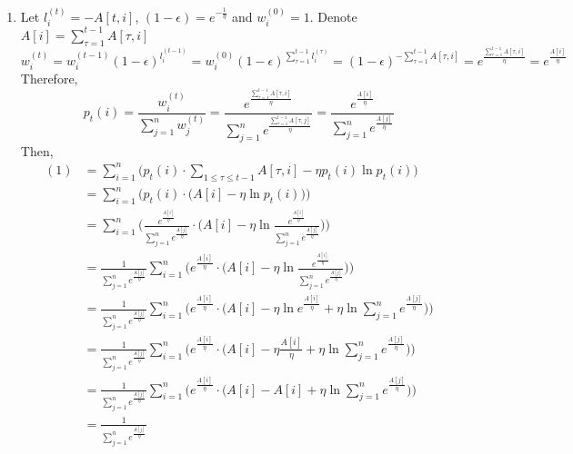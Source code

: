 \documentclass[11pt]{article}
\newenvironment{qparts}{\begin{enumerate}[{(}a{)}]}{\end{enumerate}}
\begin{document}
\begin{qparts}
	\item
	
	Let $l_i^{(t)} = - A[t, i]$, $(1 - \epsilon) = e^{- \frac{1}{\eta}}$ and $w_i^{(0)} = 1$. Denote $A[i] = \sum_{\tau=1}^{t-1} A[\tau, i]$
	\[
		w_i^{(t)} 
		= w_i^{(t-1)}(1 - \epsilon)^{l_i^{(t-1)}} 
		= w_i^{(0)}(1 - \epsilon)^{\sum_{\tau=1}^{t-1} l_i^{(\tau)}}
		= (1 - \epsilon)^{-\sum_{\tau=1}^{t-1}A[\tau, i]}
		= e^{ \frac{\sum_{\tau=1}^{t-1} A[\tau, i]}{\eta}}
		= e^{ \frac{A[i]}{\eta}}
	\]
	Therefore, 
	\[
		p_t(i)
		= \frac{w_i^{(t)}}{\sum_{j=1}^{n} w_j^{(t)} }
		= \frac{e^{ \frac{\sum_{\tau=1}^{t-1} A[\tau, i]}{\eta}}}{\sum_{j=1}^{n} e^{ \frac{\sum_{\tau=1}^{t-1} A[\tau, j]}{\eta}}}
		= \frac{e^{ \frac{A[i]}{\eta}}}{\sum_{j=1}^{n} e^{ \frac{A[j]}{\eta}}}
	\]
	Then, 
	\begin{align*}
		(1)
		&=
		\sum_{i=1}^n 
		\Bigg( 
		p_t(i) 
		\cdot 
		\sum_{1\le \tau \le t-1} A[\tau,i] 
		- 
		\eta p_t(i) \ln p_t(i) 
		\Bigg) \\
		&=
		\sum_{i=1}^n 
		\Bigg( 
		p_t(i) 
		\cdot 
		\bigg ( 
		A[i]
		- 
		\eta \ln p_t(i) 
		\bigg ) 
		\Bigg) \\
		&=
		\sum_{i=1}^n 
		\Bigg( 
		\frac{e^{ \frac{A[i]}{\eta}}}
		{\sum_{j=1}^{n} e^{ \frac{A[j]}{\eta}} } 
		\cdot 
		\bigg ( 
		A[i]
		- 
		\eta \ln 
		\frac{e^{ \frac{A[i]}{\eta}}}
		{\sum_{j=1}^{n} e^{ \frac{A[j]}{\eta}}} 
		\bigg ) 
		\Bigg) \\
		&=
		\frac{1}{\sum_{j=1}^{n} e^{ \frac{A[j]}{\eta}}}
		\sum_{i=1}^n \Bigg( 
		e^{ \frac{A[i]}{\eta}}
		\cdot 
		\bigg ( 
		A[i]
		- 
		\eta \ln 
		\frac{e^{ \frac{A[i]}{\eta}}}
		{\sum_{j=1}^{n} e^{ \frac{A[j]}{\eta}}} 
		\bigg ) 
		\Bigg) \\
		&=
		\frac{1}{\sum_{j=1}^{n} e^{ \frac{A[j]}{\eta}}}
		\sum_{i=1}^n \Bigg( 
		e^{ \frac{A[i]}{\eta}}
		\cdot 
		\bigg ( 
		A[i]
		- 
		\eta \ln 
		e^{\frac{A[i]}{\eta}}
		+
		\eta \ln 
		{\sum_{j=1}^{n} e^{ \frac{A[j]}{\eta}}} 
		\bigg ) 
		\Bigg) \\
		&=
		\frac{1}{\sum_{j=1}^{n} e^{ \frac{A[j]}{\eta}}}
		\sum_{i=1}^n \Bigg( 
		e^{ \frac{A[i]}{\eta}}
		\cdot 
		\bigg ( 
		A[i]
		- 
		\eta
		\frac{A[i]}{\eta}
		+
		\eta \ln 
		{\sum_{j=1}^{n} e^{ \frac{A[j]}{\eta}}} 
		\bigg ) 
		\Bigg) \\
		&=
		\frac{1}{\sum_{j=1}^{n} e^{ \frac{A[j]}{\eta}}}
		\sum_{i=1}^n \Bigg( 
		e^{ \frac{A[i]}{\eta}}
		\cdot 
		\bigg ( 
		A[i]
		- 
		A[i]
		+
		\eta \ln 
		{\sum_{j=1}^{n} e^{ \frac{A[j]}{\eta}}} 
		\bigg ) 
		\Bigg) \\
		&=
		\frac{1}{\sum_{j=1}^{n} e^{ \frac{A[j]}{\eta}}}

\end{align*}
\end{qparts}
\end{document}
